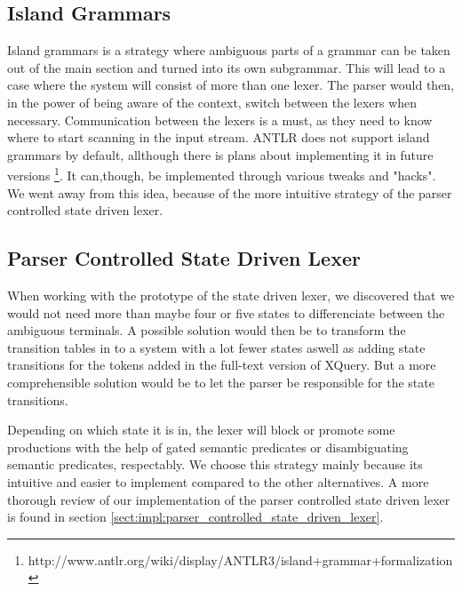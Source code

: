 \subsection{Island Grammars}
\label{sect:amiguousgrammar:islandGrammar}
Island grammars \cite{islandGrammar} is a strategy where ambiguous parts of a grammar can be taken out of the main section and turned into its own subgrammar. This will lead to a case where the system will consist of more than one lexer. The parser would then, in the power of being aware of the context, switch between the lexers when necessary. Communication between the lexers is a must, as they need to know where to start scanning in the input stream. ANTLR does not support island grammars by default, allthough there is plans about implementing it in future versions \footnote{http://www.antlr.org/wiki/display/ANTLR3/island+grammar+formalization}. It can,though, be implemented through various tweaks and "hacks". We went away from this idea, because of the more intuitive strategy of the parser controlled state driven lexer.

\subsection{Parser Controlled State Driven Lexer}
\label{sect:amiguousgrammar:parserControlled}
When working with the prototype of the state driven lexer, we discovered that we would not need more than maybe four or five states to differenciate between the ambiguous terminals. A possible solution would then be to transform the transition tables in \cite{createTokenizer} to a system with a lot fewer states aswell as adding state transitions for the tokens added in the full-text version of XQuery. But a more comprehensible solution would be to let the parser be responsible for the state transitions. 

Depending on which state it is in, the lexer will block or promote some productions with the help of gated semantic predicates or disambiguating semantic predicates, respectably. We choose this strategy mainly because its intuitive and easier to implement compared to the other alternatives. A more thorough review of our implementation of the parser controlled state driven lexer is found in section \ref{sect:impl:parser_controlled_state_driven_lexer}.
